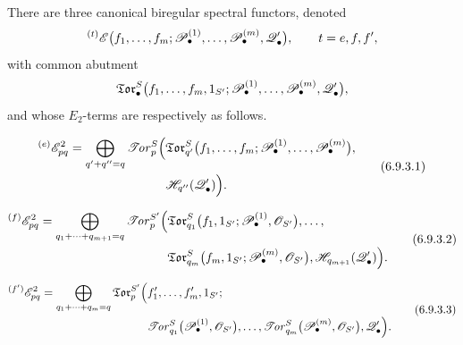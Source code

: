 \begin{proposition}[6.9.3]
\label{III.6.9.3}
There are three canonical biregular spectral functors, denoted
\[
  {}^{(t)}\mathscr{E}
  \bigl(
    f_1,\ldots,f_m;
    \mathscr{P}_\bullet^{(1)},\ldots,\mathscr{P}_\bullet^{(m)},
    \mathscr{Q}_\bullet'
  \bigr),
  \qquad
  t=e,f,f',
\]
with common abutment
\[
  \mathfrak{Tor}_\bullet^S
  \bigl(
    f_1,\ldots,f_m,1_{S'};
    \mathscr{P}_\bullet^{(1)},\ldots,\mathscr{P}_\bullet^{(m)},
    \mathscr{Q}_\bullet'
  \bigr),
\]
and whose $E_2$-terms are respectively as follows.


\begin{env}[6.9.3.1]
\label{III.6.9.3.1}
\[
\begin{split}
  {}^{(e)}\mathscr{E}_{pq}^2
  =
  \bigoplus_{q'+q''=q}
  \mathscr{T}\!\mathit{or}_p^S
  \Bigl(
    &
    \mathfrak{Tor}_{q'}^S
    \bigl(
      f_1,\ldots,f_m;
      \mathscr{P}_\bullet^{(1)},\ldots,\mathscr{P}_\bullet^{(m)}
    \bigr),
    \\
    &
    \mathscr{H}_{q''}(\mathscr{Q}_\bullet')
  \Bigr).
\end{split}
  \tag{6.9.3.1}\label{III.6.9.3.1.eq}
\]
\end{env}

\begin{env}[6.9.3.2]
\label{III.6.9.3.2}
\[
\begin{split}
  {}^{(f)}\mathscr{E}_{pq}^2
  =
  \bigoplus_{q_1+\cdots+q_{m+1}=q}
  \mathscr{T}\!\mathit{or}_p^{S'}
  \Bigl(
    &
    \mathfrak{Tor}_{q_1}^S
    \bigl(
      f_1,1_{S'};
      \mathscr{P}_\bullet^{(1)},\mathscr{O}_{S'}
    \bigr),
    \ldots,
    \\
    &
    \mathfrak{Tor}_{q_m}^S
    \bigl(
      f_m,1_{S'};
      \mathscr{P}_\bullet^{(m)},\mathscr{O}_{S'}
    \bigr),
    \mathscr{H}_{q_{m+1}}(\mathscr{Q}_\bullet')
  \Bigr).
\end{split}
  \tag{6.9.3.2}\label{III.6.9.3.2.eq}
\]
\end{env}

\begin{env}[6.9.3.3]
\label{III.6.9.3.3}
\[
\begin{split}
  {}^{(f')}\mathscr{E}_{pq}^2
  =
  \bigoplus_{q_1+\cdots+q_m=q}
  \mathfrak{Tor}_p^{S'}
  \Bigl(
    &
    f_1',\ldots,f_m',1_{S'};
    \\
    &
    \mathscr{T}\!\mathit{or}_{q_1}^S
    \bigl(
      \mathscr{P}_\bullet^{(1)},\mathscr{O}_{S'}
    \bigr),
    \ldots,
    \mathscr{T}\!\mathit{or}_{q_m}^S
    \bigl(
      \mathscr{P}_\bullet^{(m)},\mathscr{O}_{S'}
    \bigr),
    \mathscr{Q}_\bullet'
  \Bigr).
\end{split}
  \tag{6.9.3.3}\label{III.6.9.3.3.eq}
\]
\end{env}
\end{proposition}

